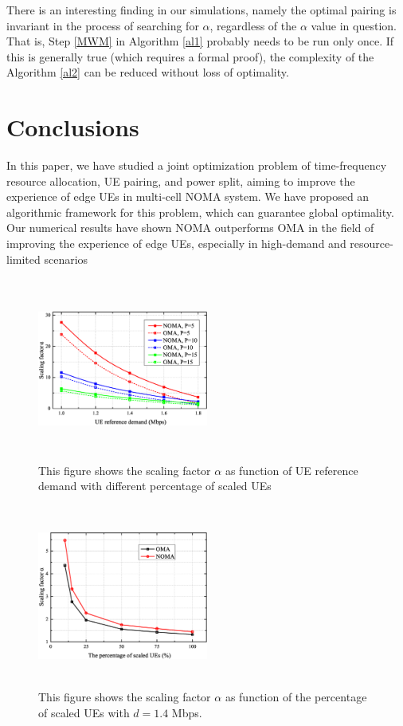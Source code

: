 \documentclass[10pt,journal,final,finalsubmission,twocolumn]{IEEEtran}
\begin{document}
There is an interesting finding in our simulations, namely the optimal pairing is invariant in the process of searching for $\alpha$, regardless of the $\alpha$ value in question. That is, Step \ref{MWM} in Algorithm \ref{al1} probably needs to be run only once. If this is generally true (which requires a formal proof), the complexity of the Algorithm \ref{al2} can be reduced without loss of optimality.




\section{Conclusions}\label{Sec:Conclusions}

In this paper, we have studied a joint optimization problem of time-frequency resource allocation, UE pairing, and power split, aiming to improve the experience of edge UEs in multi-cell NOMA system. We have proposed an algorithmic framework for this problem, which can guarantee global optimality. Our numerical results have shown NOMA outperforms OMA in the field of improving the experience of edge UEs, especially in high-demand and resource-limited scenarios




\begin{figure}
\centering
\includegraphics[width=0.5\textwidth,height=6cm]{1.eps}
\caption{This figure shows the scaling factor $\alpha$ as function of UE reference demand with different percentage of scaled UEs}
\label{1}
\end{figure}

\begin{figure}
\centering
\includegraphics[width=0.5\textwidth,height=6cm]{2.eps}
\caption{This figure shows the scaling factor $\alpha$ as function of the percentage of scaled UEs with $d=1.4$ Mbps.}
\label{2}
\end{figure}
\end{document}
